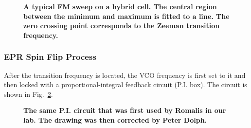 \begin{figure}[t!]
	\centering
	\caption{{\bf A typical FM sweep on a hybrid cell. The central region between the minimum and maximum is fitted to a line. The zero crossing point corresponds to the Zeeman transition frequency.}}
	\label{fmsweep}
\end{figure}

\subsubsection{EPR Spin Flip Process}

After the transition frequency is located, the VCO frequency is first set to it and then locked with a proportional-integral feedback circuit (P.I. box). The circuit is shown in Fig.~\ref{PIBox}. 

\begin{figure}[t!]
	\centering
	\caption{{\bf The same P.I. circuit that was first used by Romalis in our lab. The drawing was then corrected by Peter Dolph.\cite{PeterThesis}}}
	\label{PIBox}
\end{figure}

